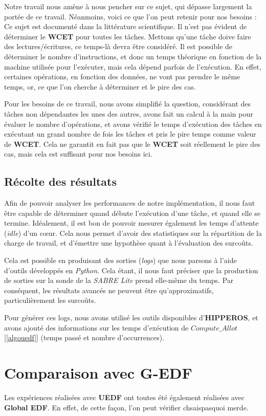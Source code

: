 Notre travail nous amène à nous pencher sur ce sujet, qui dépasse largement la portée de ce travail. 
Néanmoins, voici ce que l'on peut retenir pour nos besoins :\\
Ce sujet est documenté dans la littérature scientifique. Il n'est pas évident de déterminer le 
\textbf{WCET} pour toutes les tâches. Mettons qu'une tâche doive faire des lectures/écritures, 
ce temps-là devra être considéré. Il est possible de déterminer le nombre d'instructions, 
et donc un temps théorique en fonction de la machine utilisée pour l'exécuter, mais cela dépend 
parfois de l'exécution. En effet, certaines opérations, en fonction des données, ne vont pas prendre 
le même temps, or, ce que l'on cherche à déterminer et le pire des cas.\newline

Pour les besoins de ce travail, nous avons simplifié la question, considérant des tâches 
non dépendantes les unes des autres, avons fait un calcul à la main pour évaluer le 
nombre d'opérations, et avons vérifié le temps d'exécution des tâches en exécutant un grand nombre 
de fois les tâches et pris le pire temps comme valeur de \textbf{WCET}. Cela ne garantit en fait 
pas que le \textbf{WCET} soit réellement le pire des cas, mais cela est suffisant pour nos besoins ici.


\subsection{Récolte des résultats}
	Afin de pouvoir analyser les performances de notre implémentation, il nous faut être capable de déterminer 
	quand débute l'exécution d'une tâche, et quand elle se termine. 
	Idéalement, il est bon de pouvoir mesurer également les temps d'attente (\textit{idle}) d'un cœur. 
	Cela nous permet d'avoir des statistiques sur la répartition de la charge de travail, et 
	d'émettre une hypothèse quant à l'évaluation des surcoûts.\newline
	
	Cela est possible en produisant des sorties (\textit{logs}) que nous parsons à l'aide d'outils 
	développés en \textit{Python}. Cela étant, il nous faut préciser que la production de sorties sur la 
	sonde de la \textit{SABRE Lite} prend elle-même du temps. Par conséquent, 
	les résultats avancés ne peuvent être qu'approximatifs, particulièrement les surcoûts.\newline
	
	Pour générer ces logs, nous avons utilisé les outils disponibles d'\textbf{HIPPEROS}, et avons ajouté des informations 
	sur les temps d'exécution de $Compute\_Allot$ [\hyperref[algouedf]{\ref*{algouedf}}] (temps passé et nombre d'occurrences).
	

\section{Comparaison avec G-EDF}

	Les expériences réalisées avec \textbf{UEDF }ont toutes été également réalisées avec \textbf{Global EDF}.
	En effet, de cette façon, l'on peut vérifier chsaispasquoi merde.